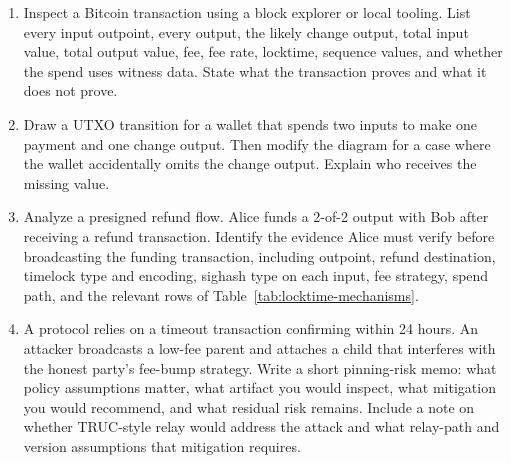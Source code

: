 \begin{enumerate}
\item Inspect a Bitcoin transaction using a block explorer or local tooling. List every input outpoint, every output, the likely change output, total input value, total output value, fee, fee rate, locktime, sequence values, and whether the spend uses witness data. State what the transaction proves and what it does not prove.

\item Draw a UTXO transition for a wallet that spends two inputs to make one payment and one change output. Then modify the diagram for a case where the wallet accidentally omits the change output. Explain who receives the missing value.

\item Analyze a presigned refund flow. Alice funds a 2-of-2 output with Bob after receiving a refund transaction. Identify the evidence Alice must verify before broadcasting the funding transaction, including outpoint, refund destination, timelock type and encoding, sighash type on each input, fee strategy, spend path, and the relevant rows of Table~\ref{tab:locktime-mechanisms}.

\item A protocol relies on a timeout transaction confirming within 24 hours. An attacker broadcasts a low-fee parent and attaches a child that interferes with the honest party's fee-bump strategy. Write a short pinning-risk memo: what policy assumptions matter, what artifact you would inspect, what mitigation you would recommend, and what residual risk remains. Include a note on whether TRUC-style relay would address the attack and what relay-path and version assumptions that mitigation requires.
\end{enumerate}
